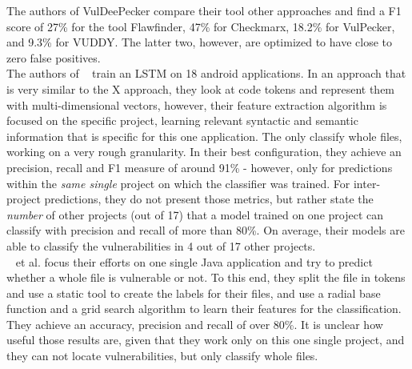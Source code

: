 \documentclass[
	a4paper,
	pagesize,
	pdftex,
	12pt,
	twoside, %
	BCOR=5mm, %
	ngerman,
	fleqn,
	final,
	]{scrartcl}
\begin{document}
The authors of VulDeePecker compare their tool other approaches and find a F1 score of 27\% for the tool Flawfinder, 47\% for Checkmarx, 18.2\% for VulPecker, and 9.3\% for VUDDY. The latter two, however, are optimized to have close to zero false positives.\\

The authors of ~\cite{Dam.2017} train an LSTM on 18 android applications. In an approach that is very similar to the X approach, they look at code tokens and represent them with multi-dimensional vectors, however, their feature extraction algorithm is focused on the specific project, learning relevant syntactic and semantic information that is specific for this one application. The only classify whole files, working on a very rough granularity. In their best configuration, they achieve an precision, recall and F1 measure of around 91\% - however, only for predictions within the \textit{same single} project on which the classifier was trained. For inter-project predictions, they do not present those metrics, but rather state the \textit{number} of other projects (out of 17) that a model trained on one project can classify with precision and recall of more than 80\%. On average, their models are able to classify the vulnerabilities in 4 out of 17 other projects.\\

~\cite{Hovsepyan.2012} et al. focus their efforts on one single Java application and try to predict whether a whole file is vulnerable or not. To this end, they split the file in tokens and use a static tool to create the labels for their files, and use a radial base function and a grid search algorithm to learn their features for the classification. They achieve an accuracy, precision and recall of over 80\%. It is unclear how useful those results are, given that they work only on this one single project, and they can not locate vulnerabilities, but only classify whole files. 
\end{document}
